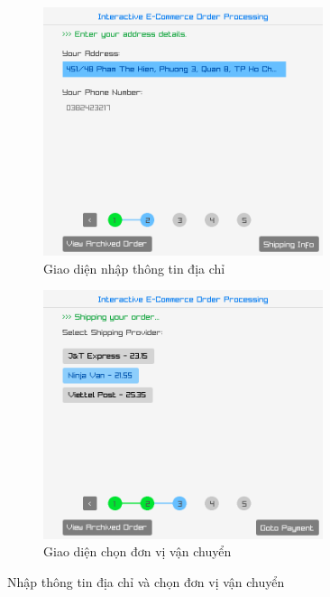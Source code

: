 \begin{figure}[!ht]
  \centering
  \begin{subfigure}{0.46\textwidth}
    \centering
    \includegraphics[width=0.9\textwidth]{../assets/screenshots/gui/address_info.png}
    \caption{Giao diện nhập thông tin địa chỉ}
  \end{subfigure}
  \hfill
  \begin{subfigure}{0.46\textwidth}
    \centering
    \includegraphics[width=0.9\textwidth]{../assets/screenshots/gui/shipping_provider.png}
    \caption{Giao diện chọn đơn vị vận chuyển}
  \end{subfigure}
  \caption{Nhập thông tin địa chỉ và chọn đơn vị vận chuyển}
\end{figure}
